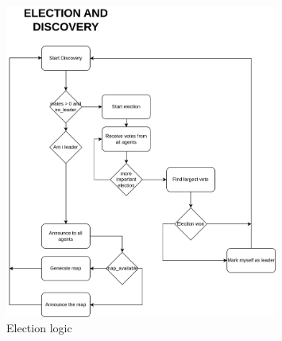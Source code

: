 \begin{figure}[H]
    \centering
    \includegraphics[width=0.8\textwidth]{pictures/election_logic.png}
    \caption{ Election logic}
    \label{fig:election_logic}
\end{figure}
